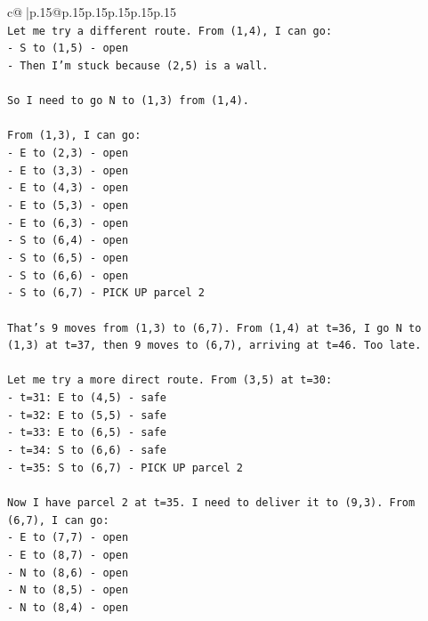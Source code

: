 \documentclass{article}
\begin{document}
{\begin{supertabular}{c@{$\;$}|p{.15\linewidth}@{}p{.15\linewidth}p{.15\linewidth}p{.15\linewidth}p{.15\linewidth}p{.15\linewidth}}
{{{\\ 
\texttt{Let me try a different route. From (1,4), I can go:} \\
\texttt{{-} S to (1,5) {-} open} \\
\texttt{{-} Then I'm stuck because (2,5) is a wall.} \\
\\ 
\texttt{So I need to go N to (1,3) from (1,4).} \\
\\ 
\texttt{From (1,3), I can go:} \\
\texttt{{-} E to (2,3) {-} open} \\
\texttt{{-} E to (3,3) {-} open} \\
\texttt{{-} E to (4,3) {-} open} \\
\texttt{{-} E to (5,3) {-} open} \\
\texttt{{-} E to (6,3) {-} open} \\
\texttt{{-} S to (6,4) {-} open} \\
\texttt{{-} S to (6,5) {-} open} \\
\texttt{{-} S to (6,6) {-} open} \\
\texttt{{-} S to (6,7) {-} PICK UP parcel 2} \\
\\ 
\texttt{That's 9 moves from (1,3) to (6,7). From (1,4) at t=36, I go N to (1,3) at t=37, then 9 moves to (6,7), arriving at t=46. Too late.} \\
\\ 
\texttt{Let me try a more direct route. From (3,5) at t=30:} \\
\texttt{{-} t=31: E to (4,5) {-} safe} \\
\texttt{{-} t=32: E to (5,5) {-} safe} \\
\texttt{{-} t=33: E to (6,5) {-} safe} \\
\texttt{{-} t=34: S to (6,6) {-} safe} \\
\texttt{{-} t=35: S to (6,7) {-} PICK UP parcel 2} \\
\\ 
\texttt{Now I have parcel 2 at t=35. I need to deliver it to (9,3). From (6,7), I can go:} \\
\texttt{{-} E to (7,7) {-} open} \\
\texttt{{-} E to (8,7) {-} open} \\
\texttt{{-} N to (8,6) {-} open} \\
\texttt{{-} N to (8,5) {-} open} \\
\texttt{{-} N to (8,4) {-} open} \\
}}}
\end{supertabular}}
\end{document}
